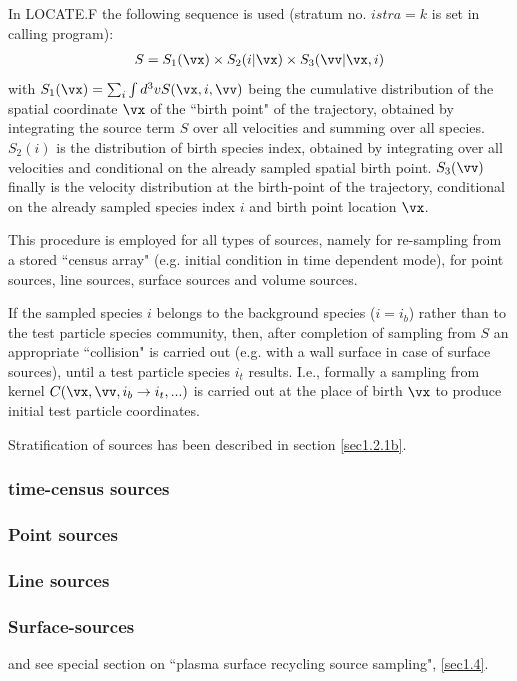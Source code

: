 In LOCATE.F the following sequence is used (stratum no. $istra=k$ is set in calling program):
\begin{eqnarray}
S = S_1(\vx) \times S_2(i|\vx) \times S_3(\vv|\vx,i)
\end{eqnarray}
with $S_1(\vx)= \sum_i\int d^3v S(\vx,i,\vv)$ being the cumulative distribution of the spatial coordinate $\vx$ of the ``birth point"
of the trajectory, obtained by integrating the source term  $S$ over all velocities and summing over all species.
$S_2(i)$ is the distribution of birth species index, obtained by integrating over all velocities and conditional on the already
sampled spatial birth point.
$S_3(\vv)$ finally is the velocity distribution at the birth-point of the trajectory, conditional on the already sampled
species index $i$ and birth point location $\vx$.

This procedure is employed for all types of sources, namely for re-sampling from a stored ``census array" (e.g. initial condition
in time dependent mode), for point sources, line sources, surface sources and volume sources.

If the sampled species $i$ belongs to the background species ($i=i_b$) rather than to the test particle species community, then, after completion
of sampling from $S$ an
appropriate ``collision" is carried out (e.g. with a wall surface in case of surface sources), until a test particle species $i_t$ results.
I.e., formally a sampling from  kernel $C(\vx,\vv,i_b \rightarrow i_t,...)$ is carried out at the place of birth $\vx$ to produce initial test particle coordinates.

Stratification of sources has been described in section \ref{sec1.2.1b}.

\subsubsection{time-census sources}
\subsubsection{Point sources}
\subsubsection{Line sources}
\subsubsection{Surface-sources}
and see special section on ``plasma surface recycling source
sampling", \ref{sec1.4}.
